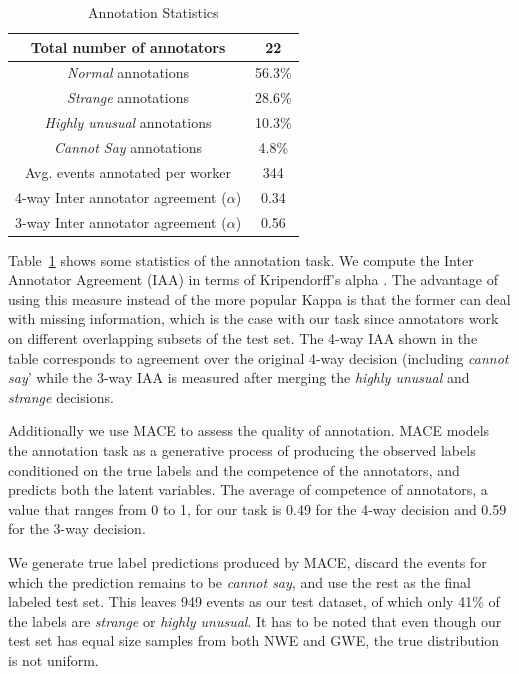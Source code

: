 \begin{table}
\begin{center}
  \begin{tabular}[c]{|c|c|}
 \hline
  Total number of annotators & 22\\
  \hline
  \textit{Normal} annotations & 56.3\% \\
  \hline
  \textit{Strange} annotations & 28.6\% \\
  \hline
  \textit{Highly unusual} annotations & 10.3\% \\
  \hline
  \textit{Cannot Say} annotations & 4.8\% \\
  \hline
  Avg. events annotated per worker & 344 \\
  \hline
  4-way Inter annotator agreement ($\alpha$) & 0.34 \\
  \hline
  3-way Inter annotator agreement ($\alpha$) & 0.56 \\
  \hline
  \end{tabular}
\end{center}
 \caption{Annotation Statistics}
 \label{table:annot}
\end{table}
Table~\ref{table:annot} shows some statistics of the annotation task.  We
compute the Inter Annotator
Agreement (IAA) in terms of Kripendorff's alpha \cite{krippendorff1980content}. 
The advantage of using this
measure instead of the more popular Kappa is that the former can deal with
missing information, which is the case with
our task since annotators work on different overlapping subsets of the test set.
 The 4-way IAA shown in the table 
corresponds to agreement over the original 4-way decision (including
\textit{cannot say}' while the 3-way IAA is measured after merging the 
\textit{highly unusual} and \textit{strange} decisions.  

Additionally we use
MACE \cite{hovy2013learning} to assess the quality of 
annotation.  MACE models the annotation task as a generative process of
producing the observed labels conditioned on the 
true labels and the competence of the annotators, and predicts both the latent
variables.  The average of competence of annotators, 
a value that ranges from 0 to 1, for our task is 0.49 for the 4-way decision and
0.59 for the 3-way decision.  

We generate
true label predictions produced by MACE, discard the events for which the
prediction remains to be \textit{cannot say}, and use the 
rest as the final labeled test set.  This leaves 949 events as our test dataset,
of which only 41\% of the labels are \textit{strange} or \textit{highly
unusual}.  It has to be noted that even though our test set 
has equal size samples from both NWE and GWE, the true distribution is not
uniform.

